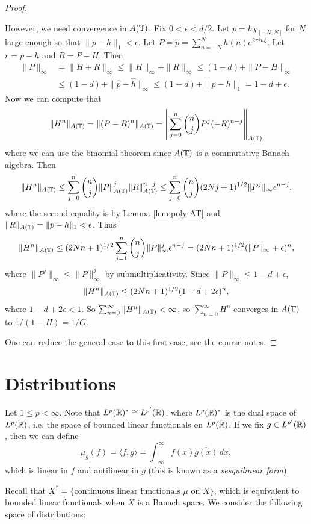 \begin{proof}
\begin{enumerate}
      However, we need convergence
      in $A(\mathbb{T})$. Fix
      $0 < \epsilon < d / 2$.
      Let $p = h \chi_{[-N, N]}$ for
      $N$ large enough so that
      $\|p - h\|_1 < \epsilon$.
      Let $P = \widehat{p} = \sum_{n = -N}^N h(n) e^{2\pi i n \xi}$.
      Let $r = p - h$
      and $R = P - H$. Then
      \begin{align*}
        \|P\|_\infty
        &= \|H + R\|_\infty
        \le \|H\|_\infty + \|R\|_\infty
        \le (1 - d) + \|P - H\|_\infty \\
        &\le (1 - d) + \|\widehat{p} - \widehat{h}\|_\infty
        \le (1 - d) + \|p - h\|_1
        = 1 - d + \epsilon.
      \end{align*}
      Now we can compute that
      \[
        \|H^n\|_{A(\mathbb{T})}
        = \|(P - R)^n\|_{A(\mathbb{T})}
        = \left\|
        \sum_{j = 0}^n \binom{n}{j} P^{j} (-R)^{n - j}
        \right\|_{A(\mathbb{T})}
      \]
      where we can use the
      binomial theorem since
      $A(\mathbb{T})$ is a commutative
      Banach algebra. Then
      \[
        \|H^n\|_{A(\mathbb{T})}
        \le \sum_{j = 0}^n \binom{n}{j}
        \|P\|_{A(\mathbb{T})}^{j} \|R\|_{A(\mathbb{T})}^{n - j}
        \le \sum_{j = 0}^n \binom{n}{j}
        (2Nj + 1)^{1 / 2}
        \|P^j\|_\infty \epsilon^{n - j},
      \]
      where the second equality is
      by Lemma \ref{lem:poly-AT}
      and $\|R\|_{A(\mathbb{T})} = \|p - h\|_1 < \epsilon$.
      Thus
      \[
        \|H^n\|_{A(\mathbb{T})}
        \le (2Nn + 1)^{1 / 2}
        \sum_{j = 1}^n \binom{n}{j}
        \|P\|_\infty^j \epsilon^{n - j}
        = (2Nn + 1)^{1 / 2}
        (\|P\|_\infty + \epsilon)^n,
      \]
      where $\|P^j\|_\infty \le \|P\|_\infty^j$
      by submultiplicativity. Since
      $\|P\|_\infty \le 1 - d + \epsilon$,
      \[
        \|H^n\|_{A(\mathbb{T})}
        \le (2Nn + 1)^{1 / 2}
        (1 - d + 2\epsilon)^n,
      \]
      where $1 - d + 2\epsilon < 1$.
      So
      $\sum_{n = 0}^\infty \|H^n\|_{A(\mathbb{T})} < \infty$,
      so $\sum_{n = 0}^\infty H^n$
      converges in $A(\mathbb{T})$ to
      $1 / (1 - H) = 1 / G$.
  \end{enumerate}
  One can reduce the general case to
  this first case, see the course
  notes.
\end{proof}

\section{Distributions}

\begin{remark}
  Let $1 \le p < \infty$.
  Note that
  $L^p(\mathbb{R})^* \cong L^{p'}(\mathbb{R})$,
  where $L^p(\mathbb{R})^*$ is the dual
  space of $L^p(\mathbb{R})$, i.e. the
  space of bounded linear functionals
  on $L^p(\mathbb{R})$. If we fix
  $g \in L^{p'}(\mathbb{R})$, then we can define
  \[
    \mu_g(f)
    = \langle f, g \rangle
    = \int_{-\infty}^\infty f(x) \overline{g(x)} \, dx,
  \]
  which is linear in $f$ and
  antilinear in $g$ (this is known
  as a \emph{sesquilinear form}).

  Recall that
  $X^* = \{\text{continuous linear functionals $\mu$ on $X$}\}$,
  which is equivalent to bounded
  linear functionals when
  $X$ is a Banach space.
  We consider the following
  space of distributions:
\end{remark}

